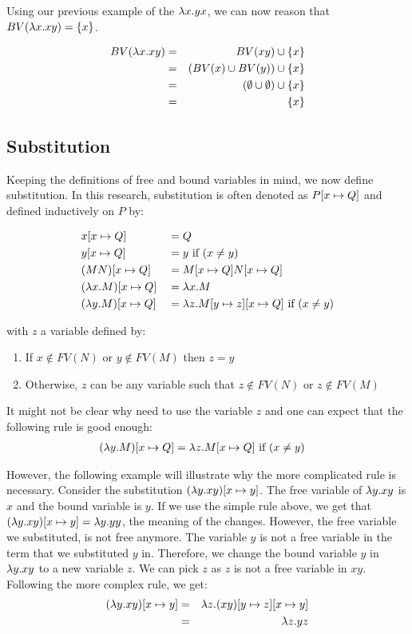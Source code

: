 Using our previous example of the \lterm $\lambda {x}.{yx}$, we can now reason that $BV(\lambda {x}.{xy}) = \{x\}$. 

\begin{eqnarray*}
	BV(\lambda {x}.{xy}) &=& BV(xy) \cup \{x\} \\
	&=& (BV(x) \cup BV(y)) \cup \{x\} \\
	&=& (\emptyset \cup \emptyset) \cup \{x\} \\
	&=& \{x\}
\end{eqnarray*}

\subsection{Substitution}
Keeping the definitions of free and bound variables in mind, we now define substitution. 
In this research, substitution is often denoted as $P [{x}\mapsto{Q}]$ and defined inductively on $P$ by:

\[
\begin{aligned}
	& x [{x}\mapsto{Q}]             & &= Q \\
	& y [{x}\mapsto{Q}]             & &= y \text{ if } (x \neq y)\\
	& (M N) [{x}\mapsto{Q}]         & &= M [{x}\mapsto{Q}] N [{x}\mapsto{Q}] \\
	& (\lambda {x}.{M}) [{x}\mapsto{Q}] & &= \lambda {x}.{M} \\
	& (\lambda {y}.{M}) [{x}\mapsto{Q}] & &= \lambda {z}.{M [{y}\mapsto{z}][{x}\mapsto{Q}]} \text{ if } (x \neq y) \\
\end{aligned}
\]

with $z$ a variable defined by:
\begin{enumerate}
	\item%
	If $x \notin FV(N)$ or $y \notin FV(M)$ then $z = y$
	\item%
	Otherwise, $z$ can be any variable such that $z \notin FV(N)$ or $z \notin FV(M)$
\end{enumerate}

It might not be clear why need to use the variable $z$ and one can expect that the following rule is good enough:
\begin{align*}
	(\lambda {y}.{M}) [{x}\mapsto{Q}] &= \lambda {z}.{M [{x}\mapsto{Q}]} \text{ if } (x \neq y)
\end{align*}

However, the following example will illustrate why the more complicated rule is necessary.
Consider the substitution $(\lambda {y}.{xy})[{x}\mapsto{y}]$. The free variable of \lterm $\lambda {y}.{xy}$ is $x$ and the bound variable is $y$.
If we use the simple rule above, we get that $(\lambda {y}.{xy})[{x}\mapsto{y}] = \lambda {y}.{yy}$, the meaning of the \lterm changes. 
However, the free variable we substituted, is not free anymore. The variable $y$ is not a free variable in the term that we substituted $y$ in.
Therefore, we change the bound variable $y$ in $\lambda {y}.{xy}$ to a new variable $z$. We can pick $z$ as $z$ is not a free variable in $xy$.
Following the more complex rule, we get: 
\begin{eqnarray*}
	(\lambda {y}.{xy})[{x}\mapsto{y}] &=& \lambda {z}.{(xy)[{y}\mapsto{z}][{x}\mapsto{y}]} \\
	&=& \lambda {z}.{yz}
\end{eqnarray*}


